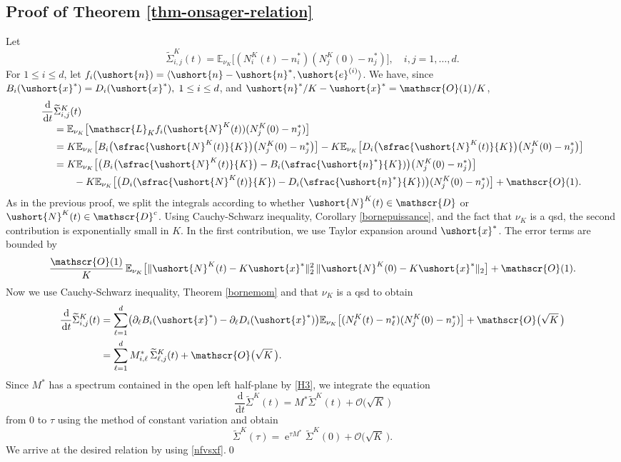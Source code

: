 \documentclass[JEP,XML,SOM,Unicode]{cedram}
\newcommand{\scaleto}[2]{#1}
\let\mathcal\mathscr
\numberwithin{equation}{section}
\theoremstyle{plain}
\theoremstyle{definition}
\newcommand{\E}{{\mathbb{E}}}
\newcommand{\Oun}{\mathcal{O}(1)}
\newcommand{\sK}{K}
\newcommand{\gen}{\mathscr{L}_{\sK}}
\newcommand{\vecn}{\ushort{n}}
\newcommand{\vecnf}{\ushort{n}^*}
\newcommand{\vecxf}{\ushort{x}^*}
\newcommand{\vece}[1]{\ushort{e}^{(#1)}}
\newcommand{\leproc}{\ushort{N}^{K}}
\newcommand{\nuk}{\nu_{K}}\let\snuk\nuk
\newcommand{\e}{\operatorname{e}}
\newcommand{\dd}{\hspace{1pt}\mathrm{d}}
\begin{document}
\subsection{Proof of Theorem \ref{thm-onsager-relation}}\label{proof:onsager}

Let
\[
\widetilde{\Sigma}_{i,j}^{\sK}(t)=\E_{\snuk}\bigl[(N_{i}^{\sK}(t)-n_{i}^{\scaleto{*}{2.5pt}})(N_{j}^{\sK}(0)-n_{j}^*)\bigr],\quad i,j=1,\ldots,d.
\]
For $1\leq i\leq d$, let $f_i(\vecn)=\langle \vecn-\vecnf,\vece{i}\rangle$.
We have, since $B_{i}(\vecxf)=D_{i}(\vecxf),\; 1\le i\le d$, and $\vecnf/K-\vecxf=\Oun/K$,\vspace*{-3pt}
\begin{align*}
\frac{\dd}{\dd t}&\widetilde{\Sigma}_{i,j}^{\sK}(t)\\[-3pt]
& =\E_{\snuk}\bigl[\gen f_i(\leproc(t)) (N_{j}^{\sK}(0)-n_{j}^{\scaleto{*}{2.5pt}})\bigr]\\
& =K\E_{\snuk}\bigl[B_{i}\bigl(\sfrac{\leproc(t)}{K}\bigr)\bigl(N_{j}^{\sK}(0)-n_{j}^{\scaleto{*}{2.5pt}}\bigr)\bigr]-K\E_{\snuk}\bigl[D_{i}\bigl(\sfrac{\leproc(t)}{K}\bigr)\bigl(N_{j}^{\sK}
(0)-n_{j}^{\scaleto{*}{2.5pt}}\bigr) \bigr]\\
&=K\E_{\snuk}\bigl[\bigl(B_{i} \bigl(\sfrac{\leproc(t)}{K} \bigr)-B_{i}(\sfrac{\vecnf}{K}) \bigr)
\bigl(N_{j}^{\sK}(0)-n_{j}^{\scaleto{*}{2.5pt}}\bigr) \bigr]\\
& \qquad -K\E_{\snuk}\bigl[\bigl(D_{i}(\sfrac{\leproc(t)}{K})
-D_{i}(\sfrac{\vecnf}{K}) \bigr)(N_{j}^{\sK}(0)-n_{j}^{\scaleto{*}{2.5pt}}) \bigr] + \Oun.
\end{align*}
As in the previous proof, we split the integrals according to whether $\leproc(t)\in \mathcal{D}$ or
$\leproc(t)\in \mathcal{D}^c$. Using Cauchy-Schwarz inequality, Corollary \ref{bornepuissance}, and the fact that $\nuk$ is a qsd, the second contribution is exponentially small in $K$. In the first contribution, we use Taylor expansion around $\vecxf$.
The error terms are bounded by
\[
\frac{\Oun}{K}\, \E_{\snuk}\bigl[\|\leproc(t)-K\vecxf\|_{2}^2\,\|\leproc(0)-K\vecxf\|_{2}\bigr]
+\Oun.
\]
Now we use Cauchy-Schwarz inequality, Theorem \ref{bornemom} and that $\nuk$ is a qsd to obtain
\begin{align*}
\frac{\dd}{\dd t}\widetilde{\Sigma}_{i,j}^{\sK}(t)&=\sum_{\ell=1}^{d}\bigl(\partial_{\ell}B_{i}(\vecxf)-\partial_{\ell}D_{i}(\vecxf)\bigr)
\E_{\snuk}\bigl[(N_{\ell}^{\sK}(t)-n_{\ell}^{\scaleto{*}{2.5pt}}) (N_{j}^{\sK}(0)-n_{j}^{\scaleto{*}{2.5pt}})\bigr]+
\mathcal{O} \bigl(\sqrt K\, \bigr)\\
& =\sum_{\ell=1}^{d}M_{i,\ell}^{*}\, \widetilde{\Sigma}^{\sK}_{\ell,j}(t)+\mathcal{O}\bigl(\sqrt K\,\bigr).
\end{align*}
Since $M^*$ has a spectrum contained in the open left half-plane by \eqref{H3}, we integrate the equation
\[
\frac{\dd}{\dd t}\widetilde{\Sigma}^{\sK}(t)= M^*\widetilde{\Sigma}^{\sK}(t)+\mathcal{O}\bigl(\sqrt K\,\bigr)
\]
from $0$ to $\tau$ using the method of constant variation and obtain
\begin{equation*}
\widetilde{\Sigma}^{\sK}(\tau)=\e^{\tau M^*}\widetilde{\Sigma}^{\sK}(0)+\mathcal{O}\bigl(\sqrt K\,\bigr).
\end{equation*}
We arrive at the desired relation by using \eqref{nfvsxf}.\qed
\end{document}
